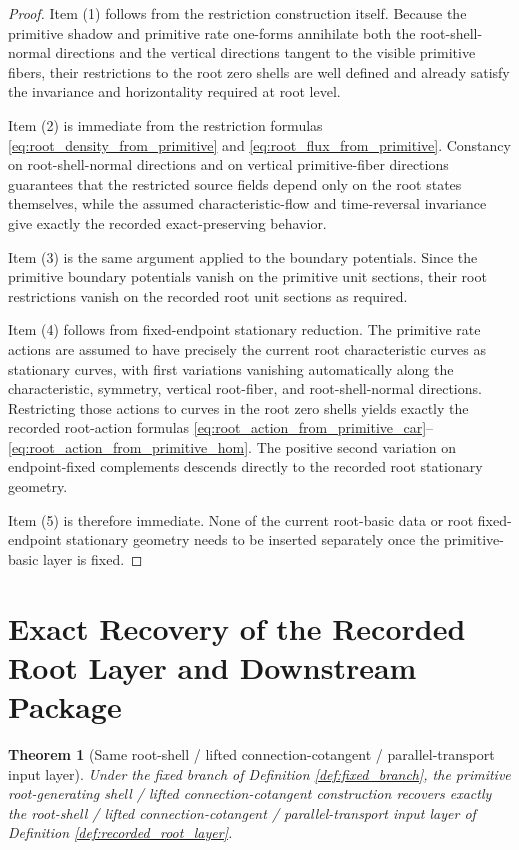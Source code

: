 \documentclass[11pt]{article}
\newtheorem{theorem}{Theorem}
\begin{document}
\begin{proof}
Item (1) follows from the restriction construction itself. Because the primitive shadow and primitive rate one-forms annihilate both the root-shell-normal directions and the vertical directions tangent to the visible primitive fibers, their restrictions to the root zero shells are well defined and already satisfy the invariance and horizontality required at root level.

Item (2) is immediate from the restriction formulas \eqref{eq:root_density_from_primitive} and \eqref{eq:root_flux_from_primitive}. Constancy on root-shell-normal directions and on vertical primitive-fiber directions guarantees that the restricted source fields depend only on the root states themselves, while the assumed characteristic-flow and time-reversal invariance give exactly the recorded exact-preserving behavior.

Item (3) is the same argument applied to the boundary potentials. Since the primitive boundary potentials vanish on the primitive unit sections, their root restrictions vanish on the recorded root unit sections as required.

Item (4) follows from fixed-endpoint stationary reduction. The primitive rate actions are assumed to have precisely the current root characteristic curves as stationary curves, with first variations vanishing automatically along the characteristic, symmetry, vertical root-fiber, and root-shell-normal directions. Restricting those actions to curves in the root zero shells yields exactly the recorded root-action formulas \eqref{eq:root_action_from_primitive_car}--\eqref{eq:root_action_from_primitive_hom}. The positive second variation on endpoint-fixed complements descends directly to the recorded root stationary geometry.

Item (5) is therefore immediate. None of the current root-basic data or root fixed-endpoint stationary geometry needs to be inserted separately once the primitive-basic layer is fixed.
\end{proof}

\section{Exact Recovery of the Recorded Root Layer and Downstream Package}

\begin{theorem}[Same root-shell / lifted connection-cotangent / parallel-transport input layer]
\label{thm:same_root_input}
Under the fixed branch of Definition \ref{def:fixed_branch}, the primitive root-generating shell / lifted connection-cotangent construction recovers exactly the root-shell / lifted connection-cotangent / parallel-transport input layer of Definition \ref{def:recorded_root_layer}.
\end{theorem}
\end{document}
